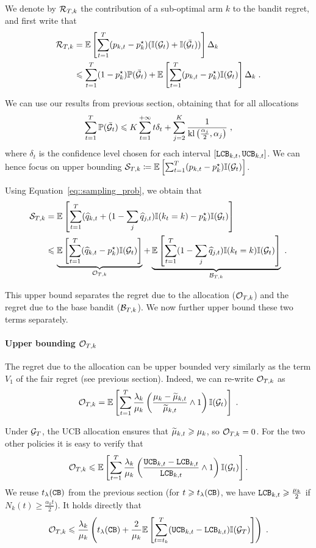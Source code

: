 We denote by $\mathcal{R}_{T,k}$ the contribution of a sub-optimal arm $k$ to the bandit regret, and first write that 
\begin{align*}
\mathcal{R}_{T,k} &= \mathbb{E}\left[\sum_{t=1}^T (p_{k,t} - p^\star_k)(\mathbb{I}(\mathcal{G}_t)+\mathbb{I}(\bar {\mathcal{G}}_t))\right]\Delta_k \\
& \leqslant \sum_{t=1}^T (1-p_k^\star) \mathbb{P}(\bar {\mathcal{G}}_t) + \mathbb{E}\left[\sum_{t=1}^T (p_{k,t} - p_k^\star)\mathbb{I}(\mathcal{G}_t)\right] \Delta_k \;.
\end{align*}

We can use our results from previous section, obtaining that for all allocations 
\[\sum_{t=1}^T \mathbb{P}(\bar {\mathcal{G}}_t) \leqslant K \sum_{t=1}^{+\infty} t\delta_t + \sum_{j=2}^K\frac{1}{\text{\normalfont kl}\left(\frac{\alpha_j}{2}, \alpha_j\right)}\;, \]
where $\delta_t$ is the confidence level chosen for each interval $[\texttt{LCB}_{k,t}, \texttt{UCB}_{k,t}]$. We can hence focus on upper bounding $\mathcal{S}_{T, k} \coloneqq \mathbb{E}\left[\sum_{t=1}^T (p_{k,t} - p_k^\star)\mathbb{I}(\mathcal{G}_t)\right]$. 

Using Equation~\eqref{eq::sampling_prob}, we obtain that 
\begin{align*}\mathcal{S}_{T,k} &= \mathbb{E}\left[\sum_{t=1}^T (\widehat{q}_{k, t} + (1-\sum_j \widehat{q}_{j, t}) \mathbb{I}(k_t=k) - p_k^\star)\mathbb{I}(\mathcal{G}_t)\right] \\
& \leqslant   \underbrace{\mathbb{E}\left[\sum_{t=1}^T (\widehat{q}_{k, t}-p_k^\star) \mathbb{I}(\mathcal{G}_t)\right]}_{\mathcal{O}_{ T,k}} + \underbrace{\mathbb{E}\left[\sum_{t=1}^T (1-\sum_j \widehat{q}_{j, t}) \mathbb{I}(k_t=k)\mathbb{I}(\mathcal{G}_t)\right]}_{\mathcal{B}_{T,k}} \;.
\end{align*}

This upper bound separates the regret due to the allocation ($\mathcal{O}_{T,k}$) and the regret due to the base bandit ($\mathcal{B}_{T,k}$). We now further upper bound these two terms separately.

\paragraph{Upper bounding $\mathcal{O}_{T, k}$} The regret due to the allocation can be upper bounded very similarly as the term $V_1$ of the fair regret (see previous section). Indeed, we can re-write $\mathcal{O}_{T,k}$ as 
\[\mathcal{O}_{T,k} =\mathbb{E}\left[\sum_{t=1}^T \frac{\lambda_k}{\mu_k}\left(\frac{\mu_k-\widetilde{\mu}_{k, t}}{\widetilde{\mu}_{k, t}} \wedge 1 \right) \mathbb{I}(\mathcal{G}_t)\right] \;.  \]

Under $\mathcal{G}_T$, the UCB allocation ensures that $\widetilde{\mu}_{k, t}\geqslant \mu_k$, so $\mathcal{O}_{T,k}=0$. For the two other policies it is easy to verify that 
\[ \mathcal{O}_{T,k} \leqslant \mathbb{E}\left[\sum_{t=1}^T \frac{\lambda_k}{\mu_k}\left(\frac{\texttt{UCB}_{k, t}- \texttt{LCB}_{k, t}}{\texttt{LCB}_{k, t}}\wedge 1\right) \mathbb{I}(\mathcal{G}_t)\right].\]
We reuse $t_\lambda(\texttt{CB})$ from the previous section (for $t\geqslant t_\lambda(\texttt{CB})$, we have $\texttt{LCB}_{k,t}\geqslant \frac{\mu_k}{2}$ if $N_k(t)\geq \frac{\alpha_k t}{2}$). It holds directly that 
\[\mathcal{O}_{T,k} \leqslant \frac{\lambda_k}{\mu_k} \left(t_\lambda(\texttt{CB}) + \frac{2}{\mu_k}\mathbb{E}\left[\sum_{t=t_k}^T (\texttt{UCB}_{k, t}- \texttt{LCB}_{k, t}) \mathbb{I}(\mathcal{G}_T)\right] \right) \;. \]

